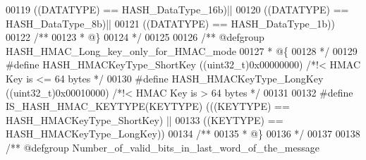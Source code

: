 \begin{DoxyCode}
00119                                     \textcolor{preprocessor}{(}\textcolor{preprocessor}{(}\textcolor{preprocessor}{DATATYPE}\textcolor{preprocessor}{)} \textcolor{preprocessor}{==} HASH_DataType_16b\textcolor{preprocessor}{)}\textcolor{preprocessor}{||}
00120                                     \textcolor{preprocessor}{(}\textcolor{preprocessor}{(}\textcolor{preprocessor}{DATATYPE}\textcolor{preprocessor}{)} \textcolor{preprocessor}{==} HASH_DataType_8b\textcolor{preprocessor}{)}\textcolor{preprocessor}{||}
00121                                     \textcolor{preprocessor}{(}\textcolor{preprocessor}{(}\textcolor{preprocessor}{DATATYPE}\textcolor{preprocessor}{)} \textcolor{preprocessor}{==} HASH_DataType_1b\textcolor{preprocessor}{)}\textcolor{preprocessor}{)}
00122 \textcolor{comment}{/**}
00123 \textcolor{comment}{  * @\}}
00124 \textcolor{comment}{  */}
00125 
00126 \textcolor{comment}{/** @defgroup HASH\_HMAC\_Long\_key\_only\_for\_HMAC\_mode  }
00127 \textcolor{comment}{  * @\{}
00128 \textcolor{comment}{  */}
00129 \textcolor{preprocessor}{#}\textcolor{preprocessor}{define} \textcolor{preprocessor}{HASH\_HMACKeyType\_ShortKey}      \textcolor{preprocessor}{(}\textcolor{preprocessor}{(}\textcolor{preprocessor}{uint32\_t}\textcolor{preprocessor}{)}0x00000000\textcolor{preprocessor}{)} \textcolor{comment}{/*!< HMAC Key is <= 64 bytes */}
00130 \textcolor{preprocessor}{#}\textcolor{preprocessor}{define} \textcolor{preprocessor}{HASH\_HMACKeyType\_LongKey}       \textcolor{preprocessor}{(}\textcolor{preprocessor}{(}\textcolor{preprocessor}{uint32\_t}\textcolor{preprocessor}{)}0x00010000\textcolor{preprocessor}{)} \textcolor{comment}{/*!< HMAC Key is > 64 bytes */}
00131 
00132 \textcolor{preprocessor}{#}\textcolor{preprocessor}{define} \textcolor{preprocessor}{IS\_HASH\_HMAC\_KEYTYPE}\textcolor{preprocessor}{(}\textcolor{preprocessor}{KEYTYPE}\textcolor{preprocessor}{)} \textcolor{preprocessor}{(}\textcolor{preprocessor}{(}\textcolor{preprocessor}{(}\textcolor{preprocessor}{KEYTYPE}\textcolor{preprocessor}{)} \textcolor{preprocessor}{==} 
      HASH_HMACKeyType_ShortKey\textcolor{preprocessor}{)} \textcolor{preprocessor}{||}
00133                                   \textcolor{preprocessor}{(}\textcolor{preprocessor}{(}\textcolor{preprocessor}{KEYTYPE}\textcolor{preprocessor}{)} \textcolor{preprocessor}{==} HASH_HMACKeyType_LongKey\textcolor{preprocessor}{)}\textcolor{preprocessor}{)}
00134 \textcolor{comment}{/**}
00135 \textcolor{comment}{  * @\}}
00136 \textcolor{comment}{  */}
00137 
00138 \textcolor{comment}{/** @defgroup Number\_of\_valid\_bits\_in\_last\_word\_of\_the\_message   }

\end{DoxyCode}
